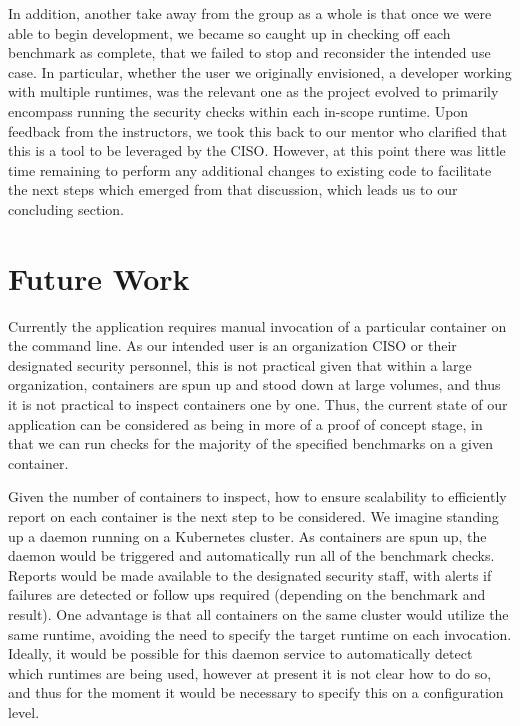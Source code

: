 \documentclass[times, twoside, watermark]{zHenriquesLab-StyleBioRxiv}
\begin{document}
In addition, another take away from the group as a whole is that once we were able to begin development, we became so caught up in checking off each benchmark as complete, that we failed to stop and reconsider the intended use case. In particular, whether the user we originally envisioned, a developer working with multiple runtimes, was the relevant one as the project evolved to primarily encompass running the security checks within each in-scope runtime. Upon feedback from the instructors, we took this back to our mentor who clarified that this is a tool to be leveraged by the CISO. However, at this point there was little time remaining to perform any additional changes to existing code to facilitate the next steps which emerged from that discussion, which leads us to our concluding section.

\section*{Future Work}

Currently the application requires manual invocation of a particular container on the command line. As our intended user is an organization CISO or their designated security personnel, this is not practical given that within a large organization, containers are spun up and stood down at large volumes, and thus it is not practical to inspect containers one by one. Thus, the current state of our application can be considered as being in more of a proof of concept stage, in that we can run checks for the majority of the specified benchmarks on a given container.

Given the number of containers to inspect, how to ensure scalability to efficiently report on each container is the next step to be considered. We imagine standing up a daemon running on a Kubernetes cluster. As containers are spun up, the daemon would be triggered and automatically run all of the benchmark checks. Reports would be made available to the designated security staff, with alerts if failures are detected or follow ups required (depending on the benchmark and result). One advantage is that all containers on the same cluster would utilize the same runtime, avoiding the need to specify the target runtime on each invocation. Ideally, it would be possible for this daemon service to automatically detect which runtimes are being used, however at present it is not clear how to do so, and thus for the moment it would be necessary to specify this on a configuration level.
\end{document}
